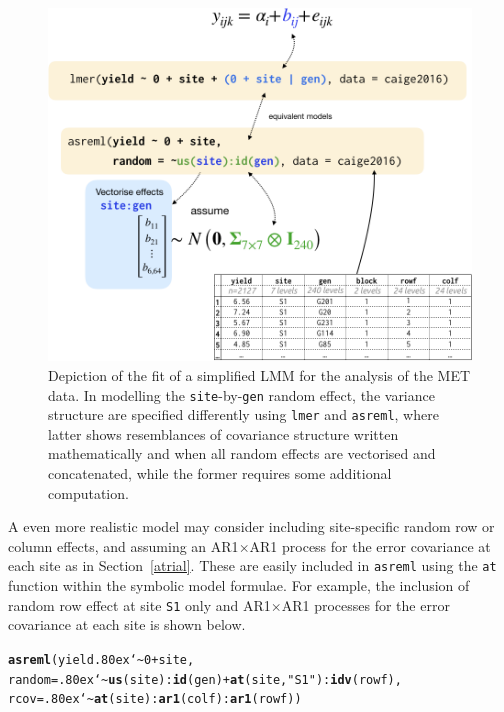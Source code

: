 \documentclass[runningheads]{llncs}\usepackage[]{graphicx}\usepackage[]{color}
\makeatletter
\newcommand{\hlnum}[1]{\textcolor[rgb]{0.686,0.059,0.569}{#1}}%
\newcommand{\hlstr}[1]{\textcolor[rgb]{0.192,0.494,0.8}{#1}}%
\newcommand{\hlopt}[1]{\textcolor[rgb]{0,0,0}{#1}}%
\newcommand{\hlstd}[1]{\textcolor[rgb]{0.345,0.345,0.345}{#1}}%
\newcommand{\hlkwc}[1]{\textcolor[rgb]{0.333,0.667,0.333}{#1}}%
\newcommand{\hlkwd}[1]{\textcolor[rgb]{0.737,0.353,0.396}{\textbf{#1}}}%
\newenvironment{kframe}{%
 \def\at@end@of@kframe{}%
 \ifinner\ifhmode%
  \def\at@end@of@kframe{\end{minipage}}%
  \begin{minipage}{\columnwidth}%
 \fi\fi%
 \def\FrameCommand##1{\hskip\@totalleftmargin \hskip-\fboxsep
 \colorbox{shadecolor}{##1}\hskip-\fboxsep
     \hskip-\linewidth \hskip-\@totalleftmargin \hskip\columnwidth}%
 \MakeFramed {\advance\hsize-\width
   \@totalleftmargin\z@ \linewidth\hsize
   \@setminipage}}%
 {\par\unskip\endMakeFramed%
 \at@end@of@kframe}
\newenvironment{knitrout}{}{} %
\newcommand{\mytilde}{\lower.80ex\hbox{\char`\~}}
\makeatother
\begin{document}
\begin{figure}
	\includegraphics[width=0.9\linewidth,fbox]{images/symbolic_lmm2} \caption{Depiction of the fit of a simplified LMM for the analysis of the MET data. In modelling the \texttt{site}-by-\texttt{gen} random effect, the variance structure are specified differently using \texttt{lmer} and \texttt{asreml}, where latter shows resemblances of covariance structure written mathematically and when all random effects are vectorised and concatenated, while the former requires some additional computation.}\label{fig:symbolic-lmm2}
\end{figure}

A even more realistic model may consider including site-specific random row or column effects, and assuming an AR1$\times$AR1 process for the error covariance at each site as in Section~\ref{atrial}. These are easily included in \texttt{asreml} using the \texttt{at} function within the symbolic model formulae. For example, the inclusion of random row effect at site \texttt{S1} only and AR1$\times$AR1 processes for the error covariance at each site is shown below.

\begin{knitrout}
	\color{fgcolor}\begin{kframe}
		\begin{alltt}
			\hlkwd{asreml}\hlstd{(yield} \hlopt{\mytilde} \hlnum{0} \hlopt{+} \hlstd{site,}
			\hlkwc{random} \hlstd{=} \hlopt{\mytilde}\hlkwd{us}\hlstd{(site)}\hlopt{:}\hlkwd{id}\hlstd{(gen)} \hlopt{+} \hlkwd{at}\hlstd{(site,} \hlstr{"S1"}\hlstd{)}\hlopt{:}\hlkwd{idv}\hlstd{(rowf),}
			\hlkwc{rcov} \hlstd{=} \hlopt{\mytilde}\hlkwd{at}\hlstd{(site)}\hlopt{:}\hlkwd{ar1}\hlstd{(colf)}\hlopt{:}\hlkwd{ar1}\hlstd{(rowf))}
		\end{alltt}
	\end{kframe}
\end{knitrout}
\end{document}
